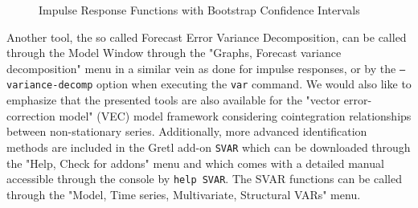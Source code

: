 \documentclass[11pt]{article}
\begin{document}
\begin{figure}[h!]
	\centering
	\caption{Impulse Response Functions with Bootstrap Confidence Intervals}
	\label{fig:IRF}
\end{figure}

Another tool, the so called Forecast Error Variance Decomposition, can be called through the Model Window through the "Graphs, Forecast variance decomposition" menu in a similar vein as done for impulse responses, or by the \texttt{---variance-decomp} option when executing the \texttt{var} command. We would also like to emphasize that the presented tools are also available for the "vector error-correction model" (VEC) model framework considering cointegration relationships between non-stationary series. Additionally, more advanced identification methods are included in the Gretl add-on \texttt{SVAR} which can be downloaded through the "Help, Check for addons" menu and which comes with a detailed manual accessible through the console by \texttt{help SVAR}. The SVAR functions can be called through the "Model, Time series, Multivariate, Structural VARs" menu.
\end{document}
